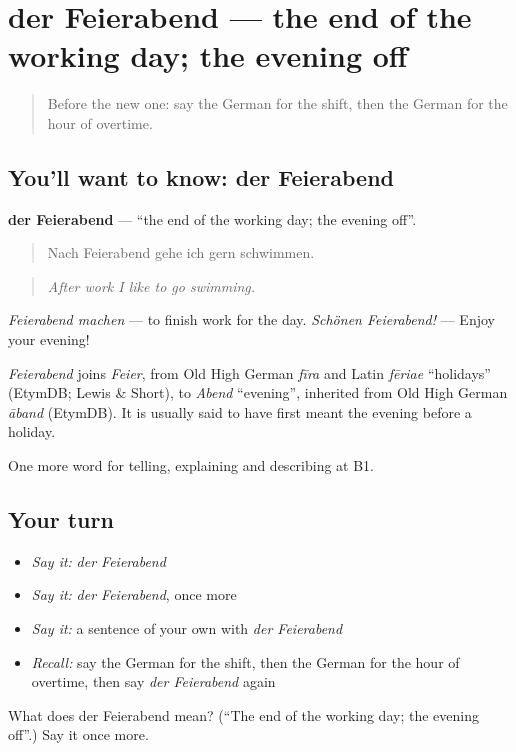 \section[der Feierabend]{der Feierabend — the end of the working day; the evening off}

\label{lesson:GE-C351-feierabend}



\begin{quote}
Before the new one: say the German for the shift, then the German for the hour of overtime.
\end{quote}

\subsection*{You'll want to know: der Feierabend}
\textbf{der Feierabend} — \textquotedblleft{}the end of the working day; the evening off\textquotedblright{}.

\begin{quote}
Nach Feierabend gehe ich gern schwimmen.
\end{quote}

\begin{quote}
\emph{After work I like to go swimming.}
\end{quote}

\emph{Feierabend machen} — to finish work for the day. \emph{Schönen Feierabend!} — Enjoy your evening!

\begin{cousinweb}
\emph{Feierabend} joins \emph{Feier}, from Old High German \emph{fīra} and Latin \emph{fēriae} \textquotedblleft{}holidays\textquotedblright{} (EtymDB; Lewis \& Short), to \emph{Abend} \textquotedblleft{}evening\textquotedblright{}, inherited from Old High German \emph{āband} (EtymDB). It is usually said to have first meant the evening before a holiday.
\end{cousinweb}

\begin{grammarlens}[title={What you've built}]
One more word for telling, explaining and describing at B1.
\end{grammarlens}

\subsection*{Your turn}
\begin{itemize}
\raggedright
  \item \emph{Say it:} \emph{der Feierabend}
  \item \emph{Say it:} \emph{der Feierabend}, once more
  \item \emph{Say it:} a sentence of your own with \emph{der Feierabend}
  \item \emph{Recall:} say the German for the shift, then the German for the hour of overtime, then say \emph{der Feierabend} again
\end{itemize}

\begin{tcolorbox}[breakable,colback=teal!4,colframe=teal!35!black,title={Before you move on}]
What does der Feierabend mean? (\textquotedblleft{}The end of the working day; the evening off\textquotedblright{}.) Say it once more.
\end{tcolorbox}
